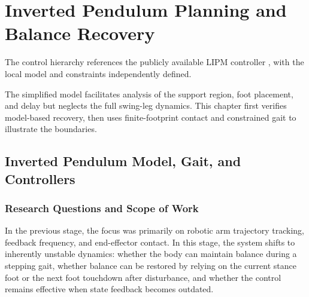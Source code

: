\chapter{Inverted Pendulum Planning and Balance Recovery}
The control hierarchy references the publicly available LIPM controller \cite{lipm}, with the local model and constraints independently defined.


The simplified model facilitates analysis of the support region, foot placement, and delay but neglects the full swing-leg dynamics. This chapter first verifies model-based recovery, then uses finite-footprint contact and constrained gait to illustrate the boundaries.

\section{Inverted Pendulum Model, Gait, and Controllers}

\label{stage:s17}

\subsection{Research Questions and Scope of Work}\label{s17-detail-1}

In the previous stage, the focus was primarily on robotic arm trajectory tracking, feedback frequency, and end-effector contact. In this stage, the system shifts to inherently unstable dynamics: whether the body can maintain balance during a stepping gait, whether balance can be restored by relying on the current stance foot or the next foot touchdown after disturbance, and whether the control remains effective when state feedback becomes outdated.

